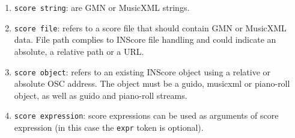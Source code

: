 \documentclass{article}
\newcommand{\OSC}[1]{{\fontsize{9.5pt}{10pt} \selectfont\texttt{#1}}}
\begin{document}
\begin{enumerate}
\item \OSC{score string}: are GMN or MusicXML strings.
\item \OSC{score file}:  refers to a score file that should contain GMN or MusicXML data. File path complies to INScore file handling and could indicate an absolute, a relative path or a URL.
\item \OSC{score object}:  refers to an existing INScore object using a relative or absolute OSC address. The object must be a guido, musicxml or piano-roll object, as well as guido and piano-roll streams.
\item \OSC{score expression}:  score expressions can be used as arguments of score expression (in this case the \OSC{expr} token is optional).
\end{enumerate}
\end{document}
